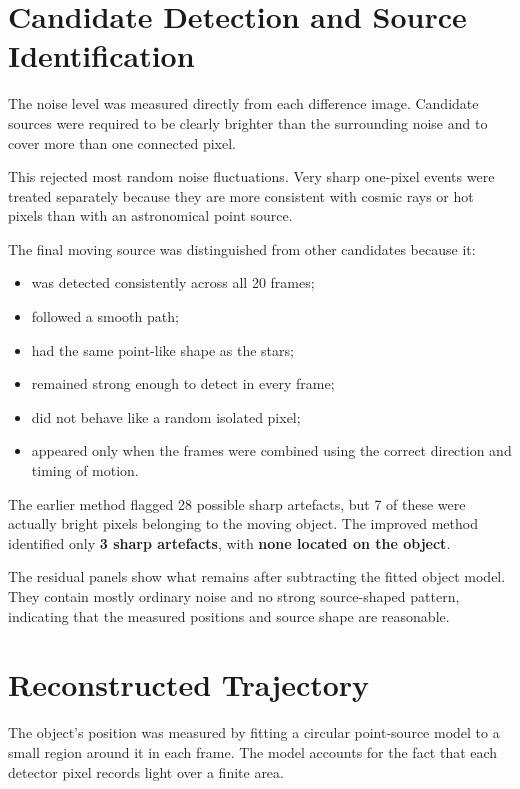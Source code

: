 \documentclass[11pt,a4paper]{article}
\begin{document}
\section{Candidate Detection and Source Identification}

The noise level was measured directly from each difference image. Candidate sources were required to be clearly brighter than the surrounding noise and to cover more than one connected pixel.

This rejected most random noise fluctuations. Very sharp one-pixel events were treated separately because they are more consistent with cosmic rays or hot pixels than with an astronomical point source.

The final moving source was distinguished from other candidates because it:
\begin{itemize}[noitemsep]
    \item was detected consistently across all 20 frames;
    \item followed a smooth path;
    \item had the same point-like shape as the stars;
    \item remained strong enough to detect in every frame;
    \item did not behave like a random isolated pixel;
    \item appeared only when the frames were combined using the correct direction and timing of motion.
\end{itemize}

The earlier method flagged 28 possible sharp artefacts, but 7 of these were actually bright pixels belonging to the moving object. The improved method identified only \textbf{3 sharp artefacts}, with \textbf{none located on the object}.

The residual panels show what remains after subtracting the fitted object model. They contain mostly ordinary noise and no strong source-shaped pattern, indicating that the measured positions and source shape are reasonable.

\section{Reconstructed Trajectory}

The object's position was measured by fitting a circular point-source model to a small region around it in each frame. The model accounts for the fact that each detector pixel records light over a finite area.
\end{document}
